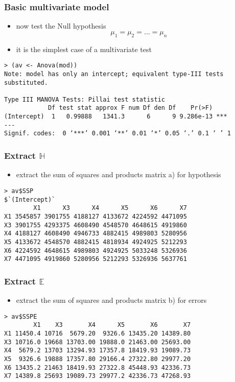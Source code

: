 \begin{frame}[fragile]\frametitle{Basic multivariate model}
  \begin{itemize}
  \item now test the Null hypothesis $$\mu_1=\mu_2=\ldots =\mu_n$$
  \item it is the simplest case of a multivariate test
  \end{itemize}\scriptsize
\begin{verbatim}
> (av <- Anova(mod))
Note: model has only an intercept; equivalent type-III tests substituted.

Type III MANOVA Tests: Pillai test statistic
            Df test stat approx F num Df den Df    Pr(>F)    
(Intercept)  1   0.99888   1341.3      6      9 9.286e-13 ***
---
Signif. codes:  0 ‘***’ 0.001 ‘**’ 0.01 ‘*’ 0.05 ‘.’ 0.1 ‘ ’ 1
\end{verbatim}
\end{frame}

\begin{frame}[fragile]\frametitle{Extract $\mathbb{H}$}
  \begin{itemize}
  \item extract the sum of squares and products matrix a) for hypothesis
  \end{itemize}\scriptsize
\begin{verbatim}
> av$SSP
$`(Intercept)`
        X1      X3      X4      X5      X6      X7
X1 3545857 3901755 4188127 4133672 4224592 4471095
X3 3901755 4293375 4608490 4548570 4648615 4919860
X4 4188127 4608490 4946733 4882415 4989803 5280956
X5 4133672 4548570 4882415 4818934 4924925 5212293
X6 4224592 4648615 4989803 4924925 5033248 5326936
X7 4471095 4919860 5280956 5212293 5326936 5637761  
\end{verbatim}
\end{frame}


\begin{frame}[fragile]\frametitle{Extract $\mathbb{E}$}
  \begin{itemize}
  \item extract the sum of squares and products matrix b) for errors
  \end{itemize}\scriptsize
\begin{verbatim}
> av$SSPE
        X1    X3       X4      X5       X6       X7
X1 11450.4 10716  5679.20  9326.6 13435.20 14389.80
X3 10716.0 19668 13703.00 19888.0 21463.00 25693.00
X4  5679.2 13703 13294.93 17357.8 18419.93 19089.73
X5  9326.6 19888 17357.80 29166.4 27322.80 29977.20
X6 13435.2 21463 18419.93 27322.8 45448.93 42336.73
X7 14389.8 25693 19089.73 29977.2 42336.73 47268.93
\end{verbatim}
\end{frame}


